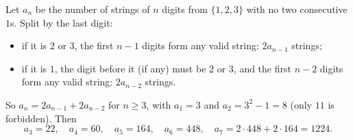 Let $a_n$ be the number of strings of $n$ digits from $\{1,2,3\}$ with no two consecutive $1$s. Split by the last digit:
\begin{itemize}
\item if it is $2$ or $3$, the first $n-1$ digits form any valid string: $2a_{n-1}$ strings;
\item if it is $1$, the digit before it (if any) must be $2$ or $3$, and the first $n-2$ digits form any valid string: $2a_{n-2}$ strings.
\end{itemize}
So $a_n=2a_{n-1}+2a_{n-2}$ for $n\ge3$, with $a_1=3$ and $a_2=3^2-1=8$ (only $11$ is forbidden). Then
\[a_3=22,\quad a_4=60,\quad a_5=164,\quad a_6=448,\quad a_7=2\cdot448+2\cdot164=\boxed{1224}.\]
